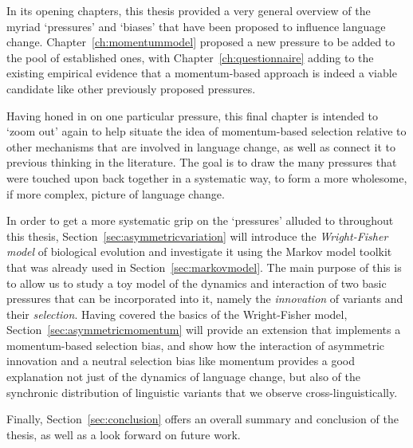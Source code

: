 
In its opening chapters, this thesis provided a very general overview of the myriad `pressures' and `biases' that have been proposed to influence language change. Chapter~\ref{ch:momentummodel} proposed a new pressure to be added to the pool of established ones, with Chapter~\ref{ch:questionnaire} adding to the existing empirical evidence that a momentum-based approach is indeed a viable candidate like other previously proposed pressures.

Having honed in on one particular pressure, this final chapter is intended to `zoom out' again to help situate the idea of momentum-based selection relative to other mechanisms that are involved in language change, as well as connect it to previous thinking in the literature. %
The goal is to draw the many pressures that were touched upon back together in a systematic way, to form a more wholesome, if more complex, picture of language change. %


In order to get a more systematic grip on the `pressures' alluded to throughout this thesis, Section~\ref{sec:asymmetricvariation} will introduce the \emph{Wright-Fisher model} of biological evolution and investigate it using the Markov model toolkit that was already used in Section~\ref{sec:markovmodel}. The main purpose of this is to allow us to study a toy model of the dynamics and interaction of two basic pressures that can be incorporated into it, namely the \emph{innovation} of variants and their \emph{selection}. Having covered the basics of the Wright-Fisher model, Section~\ref{sec:asymmetricmomentum} will provide an extension that implements a momentum-based selection bias, and show how the interaction of asymmetric innovation and a neutral selection bias like momentum provides a good explanation not just of the dynamics of language change, but also of the synchronic distribution of linguistic variants that we observe cross-linguistically.

Finally, Section~\ref{sec:conclusion} offers an overall summary and conclusion of the thesis, as well as a look forward on future work.

